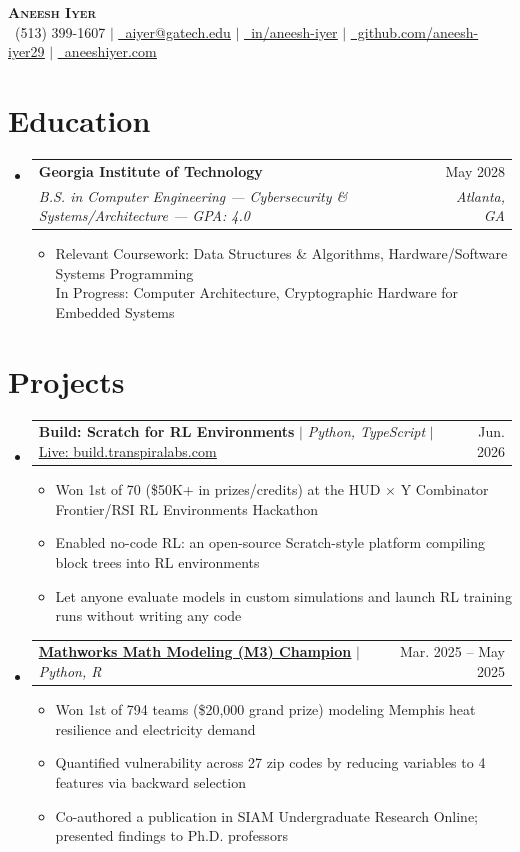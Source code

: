 \documentclass[letterpaper,11pt]{article}
\makeatletter
\newcommand{\resumeItem}[1]{
  \item[--]\small{
    {#1 \vspace{-2pt}}
  }
}
\newcommand{\resumeSubheading}[4]{
  \vspace{-2pt}\item
    \begin{tabular*}{0.97\textwidth}[t]{l@{\extracolsep{\fill}}r}
      \textbf{#1} & #2 \\
      \textit{\small#3} & \textit{\small #4} \\
    \end{tabular*}\vspace{-7pt}
}
\newcommand{\resumeProjectHeading}[2]{
    \item
    \begin{tabular*}{0.97\textwidth}{l@{\extracolsep{\fill}}r}
      \small#1 & #2 \\
    \end{tabular*}\vspace{-7pt}
}
\newcommand{\resumeSubHeadingListStart}{\begin{itemize}[leftmargin=0.15in, label={}]}
\newcommand{\resumeSubHeadingListEnd}{\end{itemize}}
\newcommand{\resumeItemListStart}{\begin{itemize}}
\newcommand{\resumeItemListEnd}{\end{itemize}\vspace{-5pt}}
\makeatother
\begin{document}

\begin{center}
    \textbf{\Huge \scshape Aneesh Iyer} \\ \vspace{1pt}
    \small \faPhone\ (513) 399-1607 $|$ \href{mailto:aiyer@gatech.edu}{\underline{\faEnvelope\ aiyer@gatech.edu}} $|$
    \href{https://linkedin.com/in/aneesh-iyer}{\underline{\faLinkedin\ in/aneesh-iyer}} $|$
    \href{https://github.com/aneesh-iyer29}{\underline{\faGithub\ github.com/aneesh-iyer29}} $|$ \href{https://aneeshiyer.com/}{\underline{\faGlobe\ aneeshiyer.com}}
\end{center}


\section{Education}
  \resumeSubHeadingListStart
    \resumeSubheading
      {Georgia Institute of Technology}{May 2028}
      {B.S. in Computer Engineering --- Cybersecurity \& Systems/Architecture --- GPA: 4.0}{Atlanta, GA}
      \begin{itemize}[label=--]
          \item Relevant Coursework: Data Structures \& Algorithms, Hardware/Software Systems Programming \\In Progress: Computer Architecture, Cryptographic Hardware for Embedded Systems
      \end{itemize}
  \resumeSubHeadingListEnd

\section{Projects}
    \resumeSubHeadingListStart
    \resumeProjectHeading
          {\textbf{Build: Scratch for RL Environments} $|$ \emph{Python, TypeScript} $|$ \href{https://build.transpiralabs.com}{\underline{Live: build.transpiralabs.com}}}{Jun. 2026}
          \resumeItemListStart
            \resumeItem{Won 1st of 70 (\$50K+ in prizes/credits) at the HUD $\times$ Y Combinator Frontier/RSI RL Environments Hackathon}
            \resumeItem{Enabled no-code RL: an open-source Scratch-style platform compiling block trees into RL environments}
            \resumeItem{Let anyone evaluate models in custom simulations and launch RL training runs without writing any code}
          \resumeItemListEnd
      \resumeProjectHeading
          {\textbf{\href{https://doi.org/10.1137/25S1777554}{\underline{Mathworks Math Modeling (M3) Champion}}} $|$ \emph{Python, R}}{Mar. 2025 -- May 2025}
          \resumeItemListStart
            \resumeItem{Won 1st of 794 teams (\$20,000 grand prize) modeling Memphis heat resilience and electricity demand}
            \resumeItem{Quantified vulnerability across 27 zip codes by reducing variables to 4 features via backward selection}
            \resumeItem{Co-authored a publication in SIAM Undergraduate Research Online; presented findings to Ph.D. professors}
          \resumeItemListEnd
    \resumeSubHeadingListEnd
\end{document}
